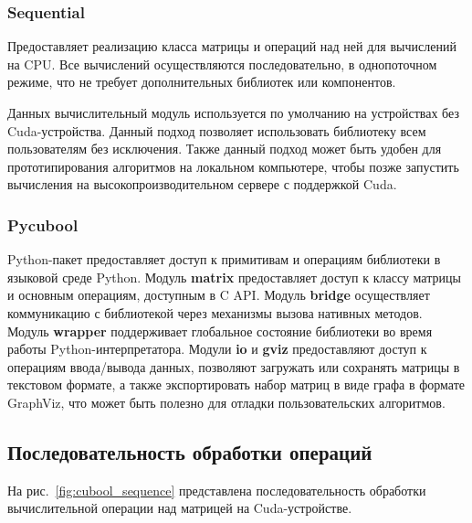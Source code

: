 \subsubsection*{Sequential}

Предоставляет реализацию класса матрицы и операций над ней для вычислений на CPU. Все вычислений осуществляются последовательно, в однопоточном режиме, что не требует дополнительных библиотек или компонентов.

Данных вычислительный модуль используется по умолчанию на устройствах без Cuda-устройства. 
Данный подход позволяет использовать библиотеку всем пользователям без исключения. 
Также данный подход может быть удобен для прототипирования алгоритмов на локальном компьютере, 
чтобы позже запустить вычисления на высокопроизводительном сервере с поддержкой Cuda.

\subsubsection*{Pycubool}

Python-пакет предоставляет доступ к примитивам и операциям библиотеки в языковой среде Python.
Модуль \textbf{matrix} предоставляет доступ к классу матрицы и основным операциям, доступным в C API.
Модуль \textbf{bridge} осуществляет коммуникацию с библиотекой через механизмы вызова нативных методов. 
Модуль \textbf{wrapper} поддерживает глобальное состояние библиотеки во время работы Python-интерпретатора. 
Модули \textbf{io} и \textbf{gviz} предоставляют доступ к операциям ввода/вывода данных, 
позволяют загружать или сохранять матрицы в текстовом формате, 
а также экспортировать набор матриц в виде графа в формате GraphViz, 
что может быть полезно для отладки пользовательских алгоритмов.

\subsection{Последовательность обработки операций}

На рис.~\ref{fig:cubool_sequence} представлена последовательность обработки вычислительной операции над матрицей на Cuda-устройстве.


